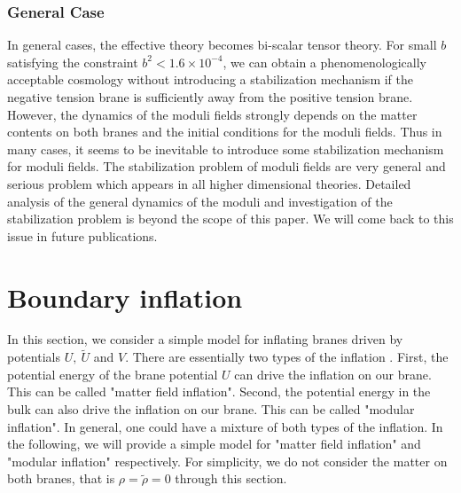 \documentclass[a4paper,11pt]{article}
\begin{document}
\subsubsection{General Case}
In general cases, the effective theory becomes bi-scalar tensor
theory. For small $b$ satisfying the constraint $b^2 < 1.6 \times 10^{-4}$, 
we can obtain a phenomenologically acceptable cosmology without introducing a
stabilization mechanism if the negative tension brane is sufficiently
away from the positive tension brane. However, the dynamics of the moduli 
fields strongly depends on the matter contents on both branes and the initial 
conditions for the moduli fields. Thus in many cases, it seems to be inevitable
to introduce some stabilization mechanism for moduli fields. The 
stabilization problem of moduli fields are very general and serious 
problem which appears in all higher dimensional theories. Detailed 
analysis of the general dynamics of the moduli and investigation of the 
stabilization problem is beyond the scope of this paper. We will come
back to this issue in future publications\cite{KK2}.

\section{Boundary inflation}
In this section, we consider a simple model for inflating branes 
driven by potentials $U,\ \tilde{U}$ and $V$. There are 
essentially two types of the inflation \cite{Lukas1}. 
First, the potential energy 
of the brane potential $U$ can drive the inflation on our brane. 
This can be called "matter field inflation".
Second, the potential energy in the bulk can also drive 
the inflation on our brane. This can be called "modular inflation".
In general, one could have a mixture of both types of the inflation. 
In the following, we will provide a simple model for "matter field
inflation" and "modular inflation" respectively. 
For simplicity, we do not consider the matter on both branes, that 
is $\rho =\tilde{\rho}=0$ through this section. 
\end{document}
